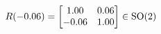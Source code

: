 \documentclass[preview]{standalone}
\begin{document}
\begin{align*}
\special{dvisvgm:raw <g id='unique000'>}R(-0.06) = \begin{bmatrix} 1.00 & 0.06 \\ -0.06 & 1.00 \end{bmatrix} \in \text{SO}(2)\special{dvisvgm:raw </g>}
\end{align*}
\end{document}
